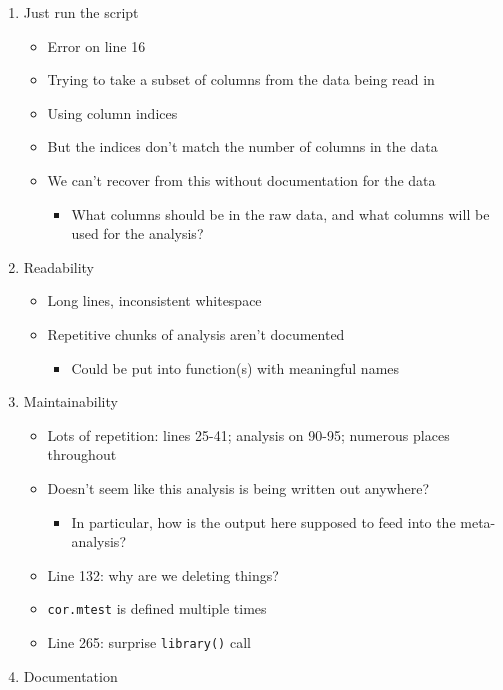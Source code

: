 \documentclass[
]{article}
\providecommand{\tightlist}{%
  \setlength{\itemsep}{0pt}\setlength{\parskip}{0pt}}
\begin{document}
\begin{enumerate}
\def\labelenumi{\arabic{enumi}.}
\setcounter{enumi}{-1}
\tightlist
\item
  Just run the script

  \begin{itemize}
  \tightlist
  \item
    Error on line 16
  \item
    Trying to take a subset of columns from the data being read in
  \item
    Using column indices
  \item
    But the indices don't match the number of columns in the data
  \item
    We can't recover from this without documentation for the data

    \begin{itemize}
    \tightlist
    \item
      What columns should be in the raw data, and what columns will be used for the analysis?
    \end{itemize}
  \end{itemize}
\item
  Readability

  \begin{itemize}
  \tightlist
  \item
    Long lines, inconsistent whitespace
  \item
    Repetitive chunks of analysis aren't documented

    \begin{itemize}
    \tightlist
    \item
      Could be put into function(s) with meaningful names
    \end{itemize}
  \end{itemize}
\item
  Maintainability

  \begin{itemize}
  \tightlist
  \item
    Lots of repetition: lines 25-41; analysis on 90-95; numerous places throughout
  \item
    Doesn't seem like this analysis is being written out anywhere?

    \begin{itemize}
    \tightlist
    \item
      In particular, how is the output here supposed to feed into the meta-analysis?
    \end{itemize}
  \item
    Line 132: why are we deleting things?
  \item
    \texttt{cor.mtest} is defined multiple times
  \item
    Line 265: surprise \texttt{library()} call
  \end{itemize}
\item
  Documentation


\end{enumerate}
\end{document}
